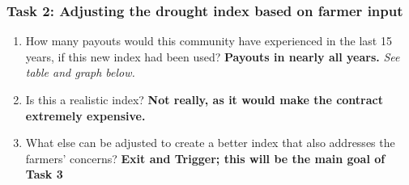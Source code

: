 \documentclass[letterpaper,10pt,english]{sphinxmanual}
\begin{document}
{\hfill}

{\hfill}


\subsubsection{Task 2: Adjusting the drought index based on farmer input}
\label{wiiet/wiiet_usingfarmerinformationanskey:task-2-adjusting-the-drought-index-based-on-farmer-input}\begin{enumerate}
\item {} 
How many payouts would this community have experienced in the last 15 years, if this new index had been used? \textbf{Payouts in nearly all years.} \emph{See table and graph below.}

\item {} 
Is this a realistic index? \textbf{Not really, as it would make the contract extremely expensive.}

\item {} 
What else can be adjusted to create a better index that also addresses the farmers' concerns? \textbf{Exit and Trigger; this will be the main goal of Task 3}

\end{enumerate}
\end{document}
